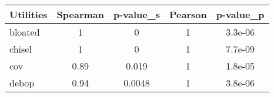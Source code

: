 \begin{tabular}{l| c c c c}
\toprule
 Utilities & Spearman & p-value_s & Pearson & p-value_p \\

\midrule
bloated & 1 & 0 & 1 & 3.3e-06 \\
chisel & 1 & 0 & 1 & 7.7e-09 \\
cov & 0.89 & 0.019 & 1 & 1.8e-05 \\
debop & 0.94 & 0.0048 & 1 & 3.8e-06 \\
\bottomrule
\end{tabular}
